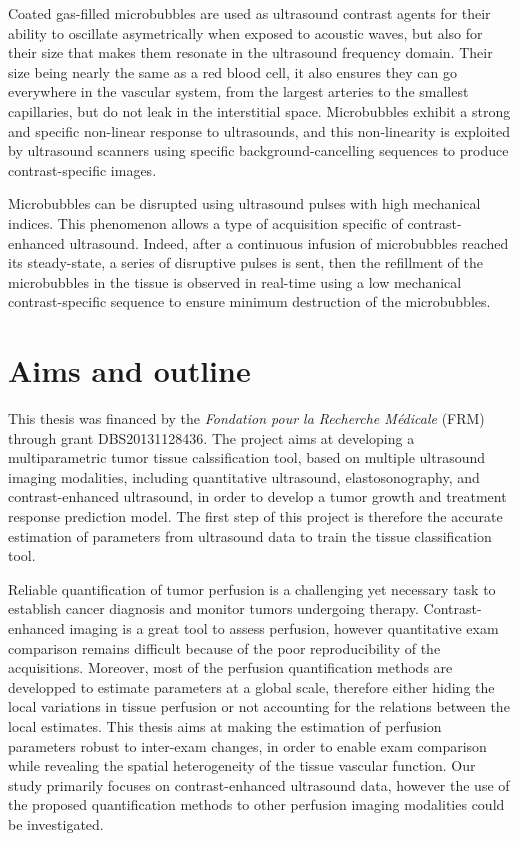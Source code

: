 Coated gas-filled microbubbles are used as ultrasound contrast agents for their ability to oscillate asymetrically when exposed to acoustic waves, but also for their size that makes them resonate in the ultrasound frequency domain.
Their size being nearly the same as a red blood cell, it also ensures they can go everywhere in the vascular system, from the largest arteries to the smallest capillaries, but do not leak in the interstitial space.
Microbubbles exhibit a strong and specific non-linear response to ultrasounds, and this non-linearity is exploited by ultrasound scanners using specific background-cancelling sequences to produce contrast-specific images.

Microbubbles can be disrupted using ultrasound pulses with high mechanical indices.
This phenomenon allows a type of acquisition specific of contrast-enhanced ultrasound. 
Indeed, after a continuous infusion of microbubbles reached its steady-state, a series of disruptive pulses is sent, then the refillment of the microbubbles in the tissue is observed in real-time using a low mechanical contrast-specific sequence to ensure minimum destruction of the microbubbles.


\section{Aims and outline}
\label{sec:IntroAimsOutline}
This thesis was financed by the {\em Fondation pour la Recherche M\'edicale} (FRM) through grant DBS20131128436.
The project aims at developing a multiparametric tumor tissue calssification tool, based on multiple ultrasound imaging modalities, including quantitative ultrasound, elastosonography, and contrast-enhanced ultrasound, in order to develop a tumor growth and treatment response prediction model.
The first step of this project is therefore the accurate estimation of parameters from ultrasound data to train the tissue classification tool.

Reliable quantification of tumor perfusion is a challenging yet necessary task to establish cancer diagnosis and monitor tumors undergoing therapy.
Contrast-enhanced imaging is a great tool to assess perfusion, however quantitative exam comparison remains difficult because of the poor reproducibility of the acquisitions.
Moreover, most of the perfusion quantification methods are developped to estimate parameters at a global scale, therefore either hiding the local variations in tissue perfusion or not accounting for the relations between the local estimates.
This thesis aims at making the estimation of perfusion parameters robust to inter-exam changes, in order to enable exam comparison while revealing the spatial heterogeneity of the tissue vascular function.
Our study primarily focuses on contrast-enhanced ultrasound data, however the use of the proposed quantification methods to other perfusion imaging modalities could be investigated.

